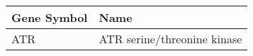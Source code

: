 \begin{tabular}{ll}
\toprule
Gene Symbol &                        Name \\
\midrule
        ATR & ATR serine/threonine kinase \\
\bottomrule
\end{tabular}
